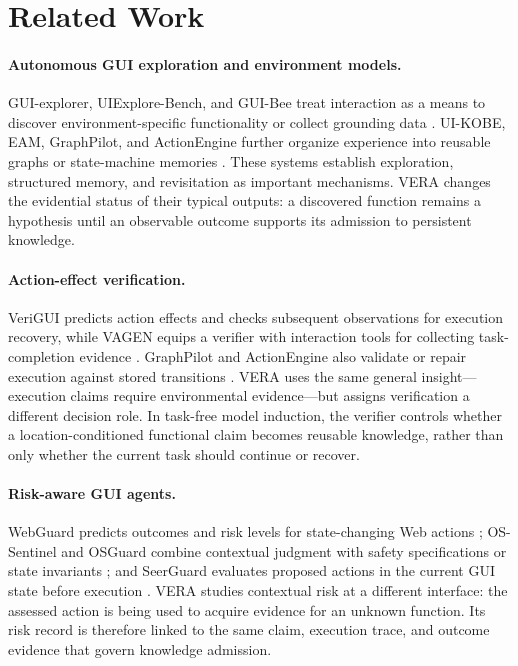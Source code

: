 \section{Related Work}
\label{sec:related-work}

\paragraph{Autonomous GUI exploration and environment models.}
GUI-explorer, UIExplore-Bench, and GUI-Bee treat interaction as a means to
discover environment-specific functionality or collect grounding data
\citep{xie2025guiexplorer,nica2025uiexplore,fan2025guibee}. UI-KOBE, EAM,
GraphPilot, and ActionEngine further organize experience into reusable graphs
or state-machine memories \citep{chai2026uikobe,qin2026eam,yu2026graphpilot,
zhong2026actionengine}. These systems establish exploration, structured memory,
and revisitation as important mechanisms. VERA changes the evidential status of
their typical outputs: a discovered function remains a hypothesis until an
observable outcome supports its admission to persistent knowledge.

\paragraph{Action-effect verification.}
VeriGUI predicts action effects and checks subsequent observations for
execution recovery, while VAGEN equips a verifier with interaction tools for
collecting task-completion evidence \citep{zhang2026verigui,cui2026vagen}.
GraphPilot and ActionEngine also validate or repair execution against stored
transitions \citep{yu2026graphpilot,zhong2026actionengine}. VERA uses the same
general insight---execution claims require environmental evidence---but assigns
verification a different decision role. In task-free model induction, the
verifier controls whether a location-conditioned functional claim becomes
reusable knowledge, rather than only whether the current task should continue
or recover.

\paragraph{Risk-aware GUI agents.}
WebGuard predicts outcomes and risk levels for state-changing Web actions
\citep{zheng2025webguard}; OS-Sentinel and OSGuard combine contextual judgment
with safety specifications or state invariants
\citep{sun2026ossentinel,mohammadmirzaei2026osguard}; and SeerGuard evaluates
proposed actions in the current GUI state before execution
\citep{yu2026seerguard}. VERA studies contextual risk at a different interface:
the assessed action is being used to acquire evidence for an unknown function.
Its risk record is therefore linked to the same claim, execution trace, and
outcome evidence that govern knowledge admission.

